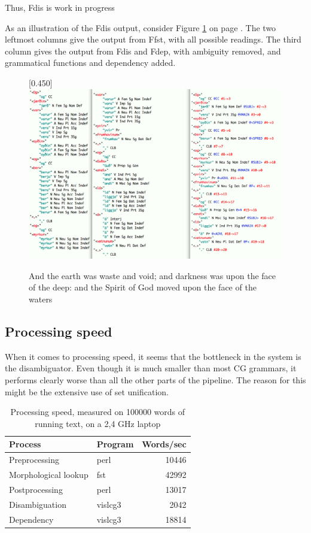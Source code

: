 \documentclass[11pt]{article}
\begin{document}
Thus, Fdis is work in progress 

As an illustration of the Fdis output, consider Figure \ref{sent3} on page \pageref{sent3}. The two leftmost columns give the output from Ffst, with all possible readings. The third column gives the output from Fdis and Fdep, with ambiguity removed, and grammatical functions and dependency added.

\begin{figure}[p]
\begin{center}
\scalebox{0.450}[0.450]{\includegraphics{img/frumhavinum.png}}
\caption{And the earth was waste and void; and darkness was upon the face of the deep: and the Spirit of God moved upon the face of the waters}
\label{sent3}
\end{center}
\end{figure}
 
\subsection{Processing speed}

When it comes to processing speed, it seems that the bottleneck in the system is the disambiguator. Even though it is much smaller than most CG grammars, it performs clearly worse than all the other parts of the pipeline. The reason for this might be the extensive use of set unification.


\begin{table}[htdp]
\caption{Processing speed, measured on 100000 words of running text, on a 2,4 GHz laptop}
\begin{center}
\begin{tabular}{|l|l|r|}
\hline
Process & Program & Words/sec \\
\hline
Preprocessing & perl &10446 \\
Morphological lookup & fst & 42992 \\
Postprocessing & perl & 13017 \\
Disambiguation & vislcg3 & 2042 \\
Dependency & vislcg3 & 18814 \\
\hline
\end{tabular}
\end{center}
\label{time}
\end{table}%
\end{document}
